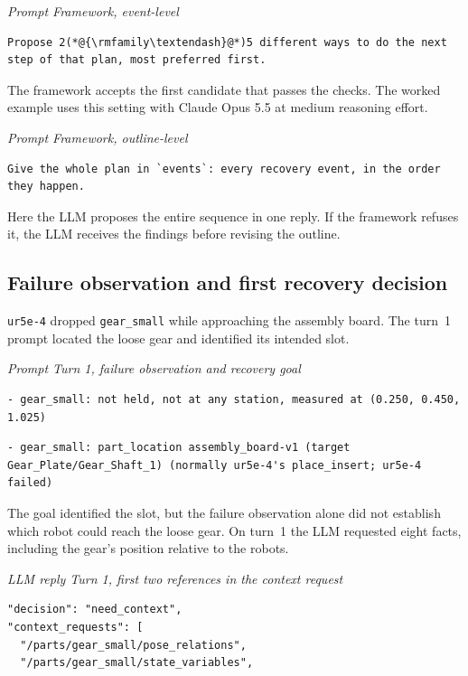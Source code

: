 \documentclass[preprint,12pt,authoryear]{elsarticle}
\let\code\nolinkurl
\newcommand{\recordlabel}[1]{\par\Needspace{4\baselineskip}\smallskip
  {\small\itshape #1\par}\nopagebreak}
\begin{document}
\recordlabel{Prompt \enspace Framework, event-level}
\begin{lstlisting}[style=recorded]
Propose 2(*@{\rmfamily\textendash}@*)5 different ways to do the next step of that plan, most preferred first.
\end{lstlisting}
The framework accepts the first candidate that passes the checks. The worked
example uses this setting with Claude Opus 5.5 at medium reasoning effort.

\recordlabel{Prompt \enspace Framework, outline-level}
\begin{lstlisting}
Give the whole plan in `events`: every recovery event, in the order they happen.
\end{lstlisting}
Here the LLM proposes the entire sequence in one reply. If the framework
refuses it, the LLM receives the findings before revising the outline.

\subsection{Failure observation and first recovery decision}\label{sec:outline-case}

\code{ur5e-4} dropped \code{gear_small} while approaching the assembly board.
The turn~1 prompt located the loose gear and identified its intended slot.

\recordlabel{Prompt \enspace Turn 1, failure observation and recovery goal}
\begin{lstlisting}
- gear_small: not held, not at any station, measured at (0.250, 0.450, 1.025)
\end{lstlisting}
\smallskip
\begin{lstlisting}
- gear_small: part_location assembly_board-v1 (target Gear_Plate/Gear_Shaft_1) (normally ur5e-4's place_insert; ur5e-4 failed)
\end{lstlisting}

The goal identified the slot, but the failure observation alone did not establish
which robot could reach the loose gear. On turn~1 the LLM requested eight facts,
including the gear's position relative to the robots.

\recordlabel{LLM reply \enspace Turn 1, first two references in the context request}
\begin{lstlisting}
"decision": "need_context",
"context_requests": [
  "/parts/gear_small/pose_relations",
  "/parts/gear_small/state_variables",
\end{lstlisting}
\end{document}
